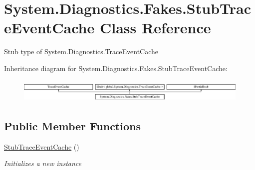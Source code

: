 \hypertarget{class_system_1_1_diagnostics_1_1_fakes_1_1_stub_trace_event_cache}{\section{System.\-Diagnostics.\-Fakes.\-Stub\-Trace\-Event\-Cache Class Reference}
\label{class_system_1_1_diagnostics_1_1_fakes_1_1_stub_trace_event_cache}
}


Stub type of System.\-Diagnostics.\-Trace\-Event\-Cache 


Inheritance diagram for System.\-Diagnostics.\-Fakes.\-Stub\-Trace\-Event\-Cache\-:\begin{figure}[H]
\begin{center}
\leavevmode
\includegraphics[height=1.148718cm]{class_system_1_1_diagnostics_1_1_fakes_1_1_stub_trace_event_cache}
\end{center}
\end{figure}
\subsection*{Public Member Functions}
\begin{DoxyCompactItemize}
\item 
\hyperlink{class_system_1_1_diagnostics_1_1_fakes_1_1_stub_trace_event_cache_af1a3b8d21c05bbcac63c1dba64451a38}{Stub\-Trace\-Event\-Cache} ()
\begin{DoxyCompactList}\small\item\em Initializes a new instance\end{DoxyCompactList}\end{DoxyCompactItemize}

